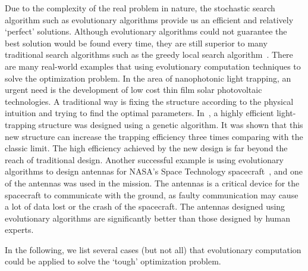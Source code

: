 Due to the complexity of the real problem in nature, the stochastic search algorithm such as evolutionary algorithms provide us an efficient and relatively `perfect' solutions. Although evolutionary algorithms could not guarantee the best solution would be found every time, they are still superior to many traditional search algorithms such as the greedy local search algorithm~\cite{Gutin200281}. There are many real-world examples that using evolutionary computation techniques to solve the optimization problem. In the area of nanophotonic light trapping, an urgent need is the development of low cost thin film solar photovoltaic technologies. A traditional way is fixing the structure according to the physical intuition and trying to find the optimal parameters. In~\cite{Wang2013}, a highly efficient light-trapping structure was designed using a genetic algorithm. It was shown that this new structure can increase the trapping efficiency three times comparing with the classic limit. The high efficiency achieved by the new design is far beyond the reach of traditional design. Another successful example is using evolutionary algorithms to design antennas for NASA's Space Technology spacecraft~\cite{Hornby2011}, and one of the antennas was used in the mission. The antennas is a critical device for the spacecraft to communicate with the ground, as faulty communication may cause a lot of data lost or the crash of the spacecraft. The antennas designed using evolutionary algorithms are significantly better than those designed by human experts. %

In the following, we list several cases (but not all) that evolutionary computation could be applied to solve the `tough' optimization problem. 

